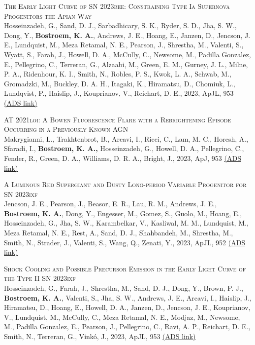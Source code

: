 \begin{revnumerate}[67]
\item{\textsc{The Early Light Curve of SN 2023bee: Constraining Type Ia Supernova Progenitors the Apian Way}\\ 
Hosseinzadeh, G., Sand, D. J., Sarbadhicary, S. K., Ryder, S. D., Jha, S. W., Dong, Y., \textbf{Bostroem, K. A.}, Andrews, J. E., Hoang, E., Janzen, D., Jencson, J. E., Lundquist, M., Meza Retamal, N. E., Pearson, J., Shrestha, M., Valenti, S., Wyatt, S., Farah, J., Howell, D. A., McCully, C., Newsome, M., Padilla Gonzalez, E., Pellegrino, C., Terreran, G., Alzaabi, M., Green, E. M., Gurney, J. L., Milne, P. A., Ridenhour, K. I., Smith, N., Robles, P. S., Kwok, L. A., Schwab, M., Gromadzki, M., Buckley, D. A. H., Itagaki, K., Hiramatsu, D., Chomiuk, L., Lundqvist, P., Haislip, J., Kouprianov, V., Reichart, D. E., 2023, ApJL, 953 
\color{blue}\href{https://ui.adsabs.harvard.edu/abs/2023ApJ...953L..15H}{(ADS link)}\color{black}}\\

\item{\textsc{AT 2021loi: A Bowen Fluorescence Flare with a Rebrightening Episode Occurring in a Previously Known AGN}\\ 
Makrygianni, L., Trakhtenbrot, B., Arcavi, I., Ricci, C., Lam, M. C., Horesh, A., Sfaradi, I., \textbf{Bostroem, K. A.,} Hosseinzadeh, G., Howell, D. A., Pellegrino, C., Fender, R., Green, D. A., Williams, D. R. A., Bright, J., 2023, ApJ, 953 
\color{blue}\href{https://ui.adsabs.harvard.edu/abs/2023ApJ...953...32M}{(ADS link)}\color{black}}\\

\item{\textsc{A Luminous Red Supergiant and Dusty Long-period Variable Progenitor for SN 2023ixf}\\ 
Jencson, J. E., Pearson, J., Beasor, E. R., Lau, R. M., Andrews, J. E., \textbf{Bostroem, K. A.}, Dong, Y., Engesser, M., Gomez, S., Guolo, M., Hoang, E., Hosseinzadeh, G., Jha, S. W., Karambelkar, V., Kasliwal, M. M., Lundquist, M., Meza Retamal, N. E., Rest, A., Sand, D. J., Shahbandeh, M., Shrestha, M., Smith, N., Strader, J., Valenti, S., Wang, Q., Zenati, Y., 2023, ApJL, 952 
\color{blue}\href{https://ui.adsabs.harvard.edu/abs/2023ApJ...952L..30J}{(ADS link)}\color{black}}\\

\item{\textsc{Shock Cooling and Possible Precursor Emission in the Early Light Curve of the Type II SN 2023ixf}\\ 
Hosseinzadeh, G., Farah, J., Shrestha, M., Sand, D. J., Dong, Y., Brown, P. J., \textbf{Bostroem, K. A.}, Valenti, S., Jha, S. W., Andrews, J. E., Arcavi, I., Haislip, J., Hiramatsu, D., Hoang, E., Howell, D. A., Janzen, D., Jencson, J. E., Kouprianov, V., Lundquist, M., McCully, C., Meza Retamal, N. E., Modjaz, M., Newsome, M., Padilla Gonzalez, E., Pearson, J., Pellegrino, C., Ravi, A. P., Reichart, D. E., Smith, N., Terreran, G., Vinkó, J., 2023, ApJL, 953 
\color{blue}\href{https://ui.adsabs.harvard.edu/abs/2023ApJ...953L..16H}{(ADS link)}\color{black}}\\


\end{revnumerate}
